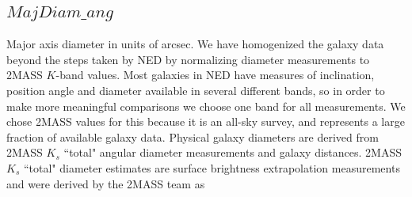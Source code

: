 \documentclass[twocolumn,tighten]{aastex62}
\begin{document}
%



\subsection{$MajDiam\_ang$} \label{diameters}
Major axis diameter in units of arcsec. We have homogenized the galaxy data beyond the steps taken by NED by normalizing diameter measurements to 2MASS $K$-band values. Most galaxies in NED have measures of inclination, position angle and diameter available in several different bands, so in order to make more meaningful comparisons we choose one band for all measurements. We chose 2MASS values for this because it is an all-sky survey, and represents a large fraction of available galaxy data. Physical galaxy diameters are derived from 2MASS $K_s$ ``total" angular diameter measurements and galaxy distances. 2MASS $K_s$ ``total" diameter estimates are surface brightness extrapolation measurements and were derived by the 2MASS team as 
\end{document}
